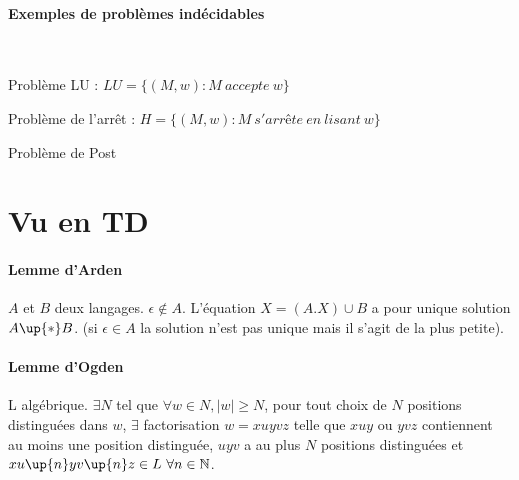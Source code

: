 \documentclass[french]{article}
\begin{document}
\paragraph{Exemples de problèmes indécidables}~

Problème LU : \( LU = \lbrace (M,w) : M~accepte~w \rbrace	 \)

Problème de l'arrêt : \(  H = \lbrace (M,w) : M~s'arrête~en~lisant~w \rbrace  \)

Problème de Post



\section{Vu en TD}
\paragraph{Lemme d'Arden}
$A$ et $B$ deux langages. $\epsilon \not\in A$. L'équation $X = (A.X)\cup B$ a pour unique solution $A\up{*}B$. (si $\epsilon \in A$ la solution n'est pas unique mais il s'agit de la plus petite).

\paragraph{Lemme d'Ogden}
L algébrique. $\exists N$ tel que $\forall w\in N, |w|\geq N$, pour tout choix de $N$ positions distinguées dans $w$, $\exists$ factorisation $w=xuyvz$ telle que $xuy$ ou $yvz$ contiennent au moins une position distinguée, $uyv$ a au plus $N$ positions distinguées et $xu\up{n}yv\up{n}z\in L\ \forall n\in\mathbb{N}$.
\end{document}
